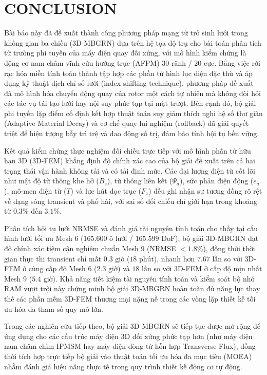 \section{CONCLUSION}

Bài báo này đã đề xuất thành công phương pháp mạng từ trở sinh lưới trong không gian ba chiều (3D-MBGRN) dựa trên hệ tọa độ trụ cho bài toán phân tích từ trường phi tuyến của máy điện quay đối xứng, với mô hình kiểm chứng là động cơ nam châm vĩnh cửu hướng trục (AFPM) 30 rãnh / 20 cực. Bằng việc rời rạc hóa miền tính toán thành tập hợp các phần tử hình lục diện đặc thù và áp dụng kỹ thuật dịch chỉ số lưới (index-shifting technique), phương pháp đề xuất đã mô hình hóa chuyển động quay của rotor một cách tự nhiên mà không đòi hỏi các tác vụ tái tạo lưới hay nội suy phức tạp tại mặt trượt. Bên cạnh đó, bộ giải phi tuyến lặp điểm cố định kết hợp thuật toán suy giảm thích nghi hệ số thư giãn (Adaptive Material Decay) và cơ chế quay lui nghiệm (rollback) đã giải quyết triệt để hiện tượng bẫy trì trệ và dao động số trị, đảm bảo tính hội tụ bền vững.

Kết quả kiểm chứng thực nghiệm đối chiếu trực tiếp với mô hình phần tử hữu hạn 3D (3D-FEM) khẳng định độ chính xác cao của bộ giải đề xuất trên cả hai trạng thái vận hành không tải và có tải định mức. Các đại lượng điện từ cốt lõi như mật độ từ thông khe hở ($B_z$), từ thông liên kết ($\Psi_a$), sức phản điện động ($e_a$), mô-men điện từ ($T$) và lực hút dọc trục ($F_z$) đều ghi nhận sự tương đồng rõ rệt về dạng sóng transient và phổ hài, với sai số đối chiếu chỉ giới hạn trong khoảng từ $0.3\%$ đến $3.1\%$.

Phân tích hội tụ lưới NRMSE và đánh giá tài nguyên tính toán cho thấy tại cấu hình lưới tối ưu Mesh 6 ($165.600$ ô lưới / $165.599$ DoF), bộ giải 3D-MBGRN đạt độ chính xác tiệm cận nghiệm chuẩn Mesh 9 (NRMSE $< 1.8\%$), đồng thời thời gian thực thi transient chỉ mất $0.3\text{ giờ}$ ($18\text{ phút}$), nhanh hơn $7.67\text{ lần}$ so với 3D-FEM ở cùng cấp độ Mesh 6 ($2.3\text{ giờ}$) và $18\text{ lần}$ so với 3D-FEM ở cấp độ mịn nhất Mesh 9 ($5.4\text{ giờ}$). Khả năng tiết kiệm tài nguyên tính toán và kiểm soát bộ nhớ RAM vượt trội này chứng minh bộ giải 3D-MBGRN hoàn toàn đủ năng lực thay thế các phần mềm 3D-FEM thương mại nặng nề trong các vòng lặp thiết kế tối ưu hóa đa tham số quy mô lớn.

Trong các nghiên cứu tiếp theo, bộ giải 3D-MBGRN sẽ tiếp tục được mở rộng để ứng dụng cho các cấu trúc máy điện 3D đối xứng phức tạp hơn (như máy điện nam châm chìm IPMSM hay máy điện dòng từ hỗn hợp Transverse Flux), đồng thời tích hợp trực tiếp bộ giải vào thuật toán tối ưu hóa đa mục tiêu (MOEA) nhằm đánh giá hiệu năng thực tế trong quy trình thiết kế động cơ tự động.